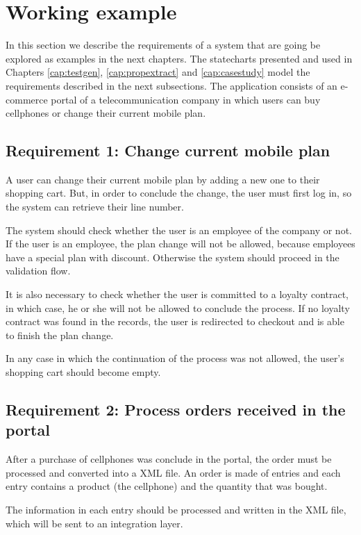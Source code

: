 \section{Working example}
\label{sec:workingExample}

In this section we describe the requirements of a system that are going be explored as examples in the next chapters. The statecharts presented and used in Chapters \ref{cap:testgen}, \ref{cap:propextract} and \ref{cap:casestudy} model the requirements described in the next subsections. The application consists of an e-commerce portal of a telecommunication company in which users can buy cellphones or change their current mobile plan.

\subsection{Requirement 1: Change current mobile plan}
\label{req1}

A user can change their current mobile plan by adding a new one to their shopping cart. But, in order to conclude the change, the user must first log in, so the system can retrieve their line number.

The system should check whether the user is an employee of the company or not. If the user is an employee, the plan change will not be allowed, because employees have a special plan with discount. Otherwise the system should proceed in the validation flow. 

It is also necessary to check whether the user is committed to a loyalty contract, in which case, he or she will not be allowed to conclude the process. If no loyalty contract was found in the records, the user is redirected to checkout and is able to finish the plan change. 

In any case in which the continuation of the process was not allowed, the user's shopping cart should become empty.

\subsection{Requirement 2: Process orders received in the portal}
\label{req2}

After a purchase of cellphones was conclude in the portal, the order must be processed and converted into a XML file. An order is made of entries and each entry contains a product (the cellphone) and the quantity that was bought.

The information in each entry should be processed and written in the XML file, which will be sent to an integration layer.

